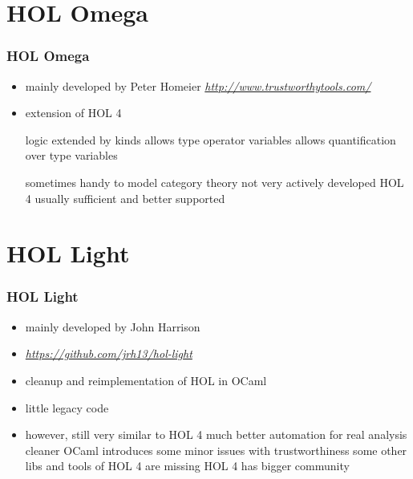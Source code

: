 \section{HOL Omega}
\begin{frame}
\frametitle{HOL Omega}

\begin{itemize}
\item mainly developed by Peter Homeier \emph{\url{http://www.trustworthytools.com/}}
\item extension of HOL 4
\begin{itemize}
\pro logic extended by kinds
\pro allows type operator variables
\pro allows quantification over type variables
\end{itemize}
\pro sometimes handy to \eg model category theory
\con not very actively developed
\con HOL 4 usually sufficient and better supported
\end{itemize}
\end{frame}


\section{HOL Light}
\begin{frame}
\frametitle{HOL Light}

\begin{itemize}
\item mainly developed by John Harrison
\item \emph{\url{https://github.com/jrh13/hol-light}}
\item cleanup and reimplementation of HOL in OCaml
\item little legacy code
\item however, still very similar to HOL 4
\pro much better automation for real analysis
\pro cleaner
\con OCaml introduces some minor issues with trustworthiness
\con some other libs and tools of HOL 4 are missing
\con HOL 4 has bigger community
\end{itemize}
\end{frame}


